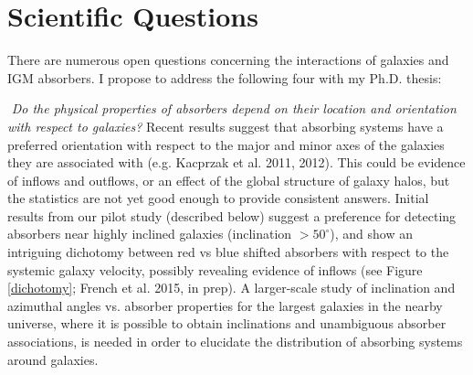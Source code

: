 \documentclass[iop]{emulateapj-rtx4}
\begin{document}
\vspace{15pt}

\section{Scientific Questions}


\indent There are numerous open questions concerning the interactions of galaxies and IGM absorbers. I propose to address the following four with my Ph.D. thesis:
\vspace{10pt}


\indent \textbullet $ $ \textit{Do the physical properties of absorbers depend on their location and orientation with respect to galaxies?} Recent results suggest that absorbing systems have a preferred orientation with respect to the major and minor axes of the galaxies they are associated with (e.g. Kacprzak et al. 2011, 2012). This could be evidence of inflows and outflows, or an effect of the global structure of galaxy halos, but the statistics are not yet good enough to provide consistent answers. Initial results from our pilot study (described below) suggest a preference for detecting absorbers near highly inclined galaxies (inclination $>50^{\circ}$), and show an intriguing dichotomy between red vs blue shifted absorbers with respect to the systemic galaxy velocity, possibly revealing evidence of inflows (see Figure \ref{dichotomy}; French et al. 2015, in prep). A larger-scale study of inclination and azimuthal angles vs. absorber properties for the largest galaxies in the nearby universe, where it is possible to obtain inclinations and unambiguous absorber associations, is needed in order to elucidate the distribution of absorbing systems around galaxies.
\end{document}
